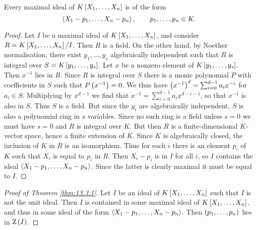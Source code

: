 \begin{corollary}
Every maximal ideal of $ K\sbr{X_1, \dots, X_n} $ is of the form
$$ \left\langle X_1 - p_1, \dots, X_n - p_n \right\rangle, \qquad p_1, \dots, p_n \in K. $$
\end{corollary}

\begin{proof}
Let $ I $ be a maximal ideal of $ K\sbr{X_1, \dots, X_n} $, and consider $ R = K\sbr{X_1, \dots, X_n} / I $. Then $ R $ is a field. On the other hand, by Noether normalisation, there exist $ y_1, \dots, y_s $ algebraically independent such that $ R $ is integral over $ S = K\sbr{y_1, \dots, y_s} $. Let $ x $ be a nonzero element of $ K\sbr{y_1, \dots, y_s} $. Then $ x^{-1} $ lies in $ R $. Since $ R $ is integral over $ S $ there is a monic polynomial $ P $ with coefficients in $ S $ such that $ P\br{x^{-1}} = 0 $. We thus have $ \br{x^{-1}}^d = \sum_{i = 0}^{d - 1} a_ix^{-i} $ for $ a_i \in S $. Multiplying by $ x^{d - 1} $ we find that $ x^{-1} = \sum_{i = 0}^{d - 1} a_ix^{d - i - 1} $, so that $ x^{-1} $ is also in $ S $. Thus $ S $ is a field. But since the $ y_i $ are algebraically independent, $ S $ is also a polynomial ring in $ s $ variables. Since no such ring is a field unless $ s = 0 $ we must have $ s = 0 $ and $ R $ is integral over $ K $. But then $ R $ is a finite-dimensional $ K $-vector space, hence a finite extension of $ K $. Since $ K $ is algebraically closed, the inclusion of $ K $ in $ R $ is an isomorphism. Thus for each $ i $ there is an element $ p_i $ of $ K $ such that $ X_i $ is equal to $ p_i $ in $ R $. Then $ X_i - p_i $ is in $ I $ for all $ i $, so $ I $ contains the ideal $ \left\langle X_1 - p_1, \dots, X_n - p_n \right\rangle $. Since the latter is clearly maximal it must be equal to $ I $.
\end{proof}

\begin{proof}[Proof of Theorem \ref{thm:13.3.1}]
Let $ I $ be an ideal of $ K\sbr{X_1, \dots, X_n} $ such that $ I $ is not the unit ideal. Then $ I $ is contained in some maximal ideal of $ K\sbr{X_1, \dots, X_n} $, and thus in some ideal of the form $ \left\langle X_1 - p_1, \dots, X_n - p_n \right\rangle $. Then $ \br{p_1, \dots, p_n} $ lies in $ \Z\br{I} $.
\end{proof}

